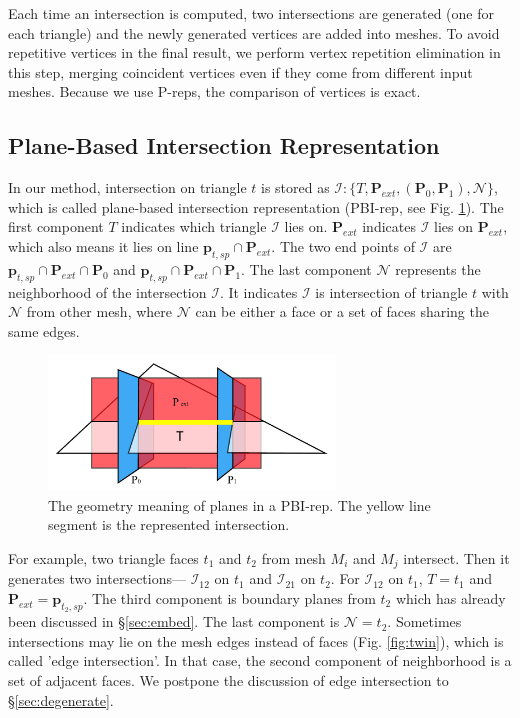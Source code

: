 \documentclass[10pt,journal,compsoc]{IEEEtran}
\begin{document}
Each time an intersection is computed, two intersections are generated (one for each triangle) and the newly generated vertices are added into meshes. To avoid repetitive vertices in the final result, we perform vertex repetition elimination in this step, merging coincident vertices even if they come from different input meshes. Because we use P-reps, the comparison of vertices is exact.

\subsection{Plane-Based Intersection Representation}
\label{sec:ir}

In our method, intersection on triangle $t$ is stored as $\bm{\mathcal{I}}\colon\{T, \bm{P}_{ext}, (\bm{P}_0, \bm{P}_1), \mathcal{N}\}$, which is called plane-based intersection representation (PBI-rep,  see Fig. \ref{fig:pbi}). The first component $T$ indicates which triangle $\bm{\mathcal{I}}$ lies on. $\bm{P}_{ext}$ indicates $\bm{\mathcal{I}}$ lies on $\bm{P}_{ext}$, which also means it lies on line $\bm{p}_{t, sp} \cap \bm{P}_{ext}$. The two end points of $\bm{\mathcal{I}}$ are $\bm{p}_{t, sp} \cap \bm{P}_{ext}\cap\bm{P}_0$ and $\bm{p}_{t, sp} \cap \bm{P}_{ext}\cap\bm{P}_1$. The last component $\mathcal{N}$ represents the neighborhood of the intersection $\bm{\mathcal{I}}$. It indicates $\bm{\mathcal{I}}$ is intersection of triangle $t$ with $\mathcal{N}$ from other mesh, where $\mathcal{N}$ can be either a face or a set of faces sharing the same edges.

\begin{figure}[t]
\centering
\includegraphics[width=3in]{pbirep2}
\caption{The geometry meaning of planes in a PBI-rep. The yellow line segment is the represented intersection.}
\label{fig:pbi}
\end{figure}

For example, two triangle faces $t_1$ and $t_2$ from mesh $M_i$ and $M_j$ intersect. Then it generates two intersections--- ${\bm{\mathcal{I}}}_{12}$ on $t_1$ and ${\bm{\mathcal{I}}}_{21}$ on $t_2$. For ${\bm{\mathcal{I}}}_{12}$ on $t_1$, $T = t_1$ and $\bm{P}_{ext}=\bm{p}_{t_2, sp}$. The third component is boundary planes from $t_2$ which has already been discussed in \S\ref{sec:embed}. The last component is $\mathcal{N}=t_2$. Sometimes intersections may lie on the mesh edges instead of faces (Fig. \ref{fig:twin}), which is called 'edge intersection'. In that case, the second component of neighborhood is a set of adjacent faces. We postpone the discussion of edge intersection to \S\ref{sec:degenerate}.
\end{document}
